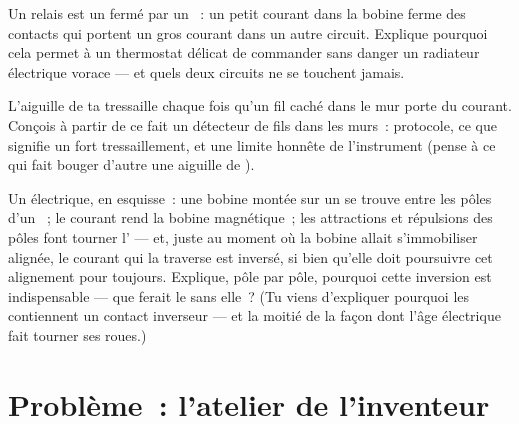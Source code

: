 \begin{exercise}[$\star\star$]\label{exo:g8:electric-current-effects:10}
Un relais est un  fermé par un ~: un petit
courant dans la bobine ferme des contacts qui portent un gros courant
dans un autre circuit. Explique pourquoi cela permet à un thermostat
délicat de commander sans danger un radiateur électrique vorace ---
et quels deux circuits ne se touchent jamais.
\end{exercise}

\begin{exercise}[$\star\star$]\label{exo:g8:electric-current-effects:11}
L'aiguille de ta  tressaille chaque fois qu'un fil caché dans
le mur porte du courant. Conçois à partir de ce fait un détecteur de
fils dans les murs~: protocole, ce que signifie un fort
tressaillement, et une limite honnête de l'instrument (pense à ce qui
fait bouger d'autre une aiguille de ).
\end{exercise}

\begin{exercise}[$\star\star\star$]\label{exo:g8:electric-current-effects:12}
Un  électrique, en esquisse~: une bobine montée sur un  se
trouve entre les pôles d'un ~; le courant rend la bobine
magnétique~; les attractions et répulsions des pôles font tourner
l' --- et, juste au moment où la bobine allait s'immobiliser
alignée, le courant qui la traverse est inversé, si bien qu'elle doit
poursuivre cet alignement pour toujours. Explique, pôle par pôle,
pourquoi cette inversion est indispensable --- que ferait le 
sans elle~? (Tu viens d'expliquer pourquoi les  contiennent un
contact inverseur --- et la moitié de la façon dont l'âge électrique
fait tourner ses roues.)
\end{exercise}

\section{Problème~: l'atelier de l'inventeur}

